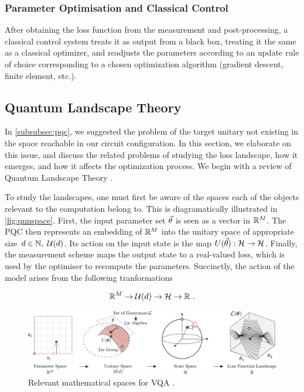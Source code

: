 \subsubsection{Parameter Optimisation and Classical Control}

After obtaining the loss function from the measurement and post-processing, a
classical control system treats it as output from a black box, treating it the
same as a classical optimizer, and readjusts the parameters according to an
update rule of choice corresponding to a chosen optimization algorithm (gradient
descent, finite element, etc.). 

\subsection{Quantum Landscape Theory}
\label{subsec:quantlandscape}

In \autoref{subsubsec:pqc}, we suggested the problem of the target unitary not
existing in the space reachable in our circuit configuration. In this section,
we elaborate on this issue, and discuss the related problems of studying the
loss landscape, how it emerges, and how it affects the optimization process. We
begin with a review of Quantum Landscape Theory \cite[see][chapter
II.B]{larocca2021theory}.

To study the landscapes, one must first be aware of the spaces each of the
objects relevant to the computation belong to. This is diagramatically
illustrated in \autoref{fig:qnnspace}. First, the input parameter set
\(\vec{\theta}\) is seen as a vector in \(\mathbb{R}^M\). The PQC then represents an
embedding of \(\mathbb{R}^M\) into the unitary space of appropriate size
\(d\in\mathbb{N},~ \mathcal{U}(d)\). Its action on the input state is the map
\(U(\vec{\theta}): \mathcal{H} \to \mathcal{H}\). Finally, the measurement
scheme maps the output state to a real-valued loss, which is used by the
optimiser to recompute the parameters. Succinctly, the action of the model
arises from the following tranformations

\begin{gather}
    \mathbb{R}^M \to \mathcal{U}(d) \to \mathcal{H} \to \mathbb{R}~.
    \label{eq:transformations}
\end{gather}

\begin{figure}[!ht]
    \includegraphics[width=\textwidth]{figures/mapsurjective.pdf}
    \caption{Relevant mathematical spaces for VQA \cite[taken from][Figure
            2]{larocca2021theory}.}
    \label{fig:qnnspace}
\end{figure}

